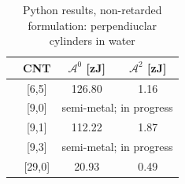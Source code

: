 \documentclass[onecolumn,letterpaper,amsmath,amssymb,floatfix,aps,superscriptaddress]{revtex4}
\begin{document}
\begin{table}[ht]
\caption{Python results, non-retarded formulation: perpendiuclar cylinders in water}%
\centering
\begin{tabular}{r c | c | c}
  \hline
  &\hspace{0.25in}CNT \hspace{0.25in}& \hspace{0.25in}$\mathcal{A}^{0}$    [zJ] \hspace{0.25in}& \hspace{0.25in}$\mathcal{A}^{2}$    [zJ] \hspace{0.25in}\\
  \hline\hline                       
  &[6,5]  & 126.80 & 1.16 \\
  \hline
  &[9,0]  & \multicolumn{2}{c}{semi-metal; in progress}\\
  \hline
  &[9,1]  & 112.22 & 1.87 \\
  \hline
  &[9,3]  & \multicolumn{2}{c}{semi-metal; in progress}\\
  \hline
  &[29,0] & 20.93 & 0.49 \\
  \hline  
\end{tabular}
\label{table:nonlin}
\end{table}
\end{document}
